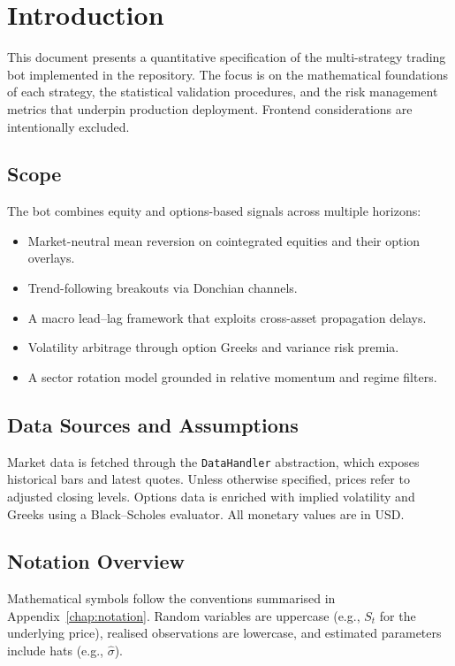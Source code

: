 \chapter{Introduction}

This document presents a quantitative specification of the multi-strategy trading bot implemented in the repository. The focus is on the mathematical foundations of each strategy, the statistical validation procedures, and the risk management metrics that underpin production deployment. Frontend considerations are intentionally excluded.

\section{Scope}
The bot combines equity and options-based signals across multiple horizons:
\begin{itemize}[noitemsep]
    \item Market-neutral mean reversion on cointegrated equities and their option overlays.
    \item Trend-following breakouts via Donchian channels.
    \item A macro lead--lag framework that exploits cross-asset propagation delays.
    \item Volatility arbitrage through option Greeks and variance risk premia.
    \item A sector rotation model grounded in relative momentum and regime filters.
\end{itemize}

\section{Data Sources and Assumptions}
Market data is fetched through the \texttt{DataHandler} abstraction, which exposes historical bars and latest quotes. Unless otherwise specified, prices refer to adjusted closing levels. Options data is enriched with implied volatility and Greeks using a Black--Scholes evaluator. All monetary values are in USD.

\section{Notation Overview}
Mathematical symbols follow the conventions summarised in Appendix~\ref{chap:notation}. Random variables are uppercase (e.g., $S_t$ for the underlying price), realised observations are lowercase, and estimated parameters include hats (e.g., $\hat{\sigma}$).

